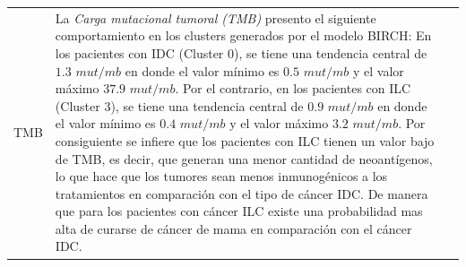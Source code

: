 \begin{table}
	\footnotesize
	\begin{threeparttable}
		\begin{tabular}{p{2.5cm} p{7cm} p{6.5cm}} \toprule
			TMB
			& La \textit{Carga mutacional tumoral (TMB)} presento el siguiente comportamiento en los clusters generados por el modelo BIRCH: En los pacientes con IDC (Cluster 0), se tiene una tendencia central de $1.3$ $mut/mb$ en donde el valor mínimo es $0.5$ $mut/mb$ y el valor máximo $37.9$ $mut/mb$. Por el contrario, en los pacientes con ILC (Cluster 3), se tiene una tendencia central de $0.9$ $mut/mb$ en donde el valor mínimo es $0.4$ $mut/mb$ y el valor máximo $3.2$ $mut/mb$. Por consiguiente se infiere que los pacientes con ILC tienen un valor bajo de TMB, es decir, que generan una menor cantidad de neoantígenos, lo que hace que los tumores sean menos inmunogénicos a los tratamientos en comparación con el tipo de cáncer IDC. De manera que para los pacientes con cáncer ILC existe una probabilidad mas alta de curarse de cáncer de mama en comparación con el cáncer IDC.  


\end{tabular}
\end{threeparttable}
\end{table}
